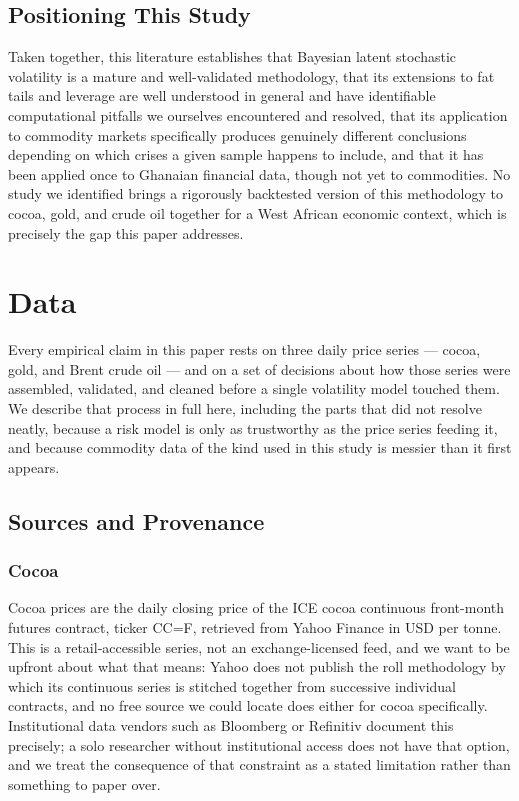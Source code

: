 \documentclass[preprint,12pt,authoryear]{elsarticle}
\begin{document}
\subsection{Positioning This Study}

Taken together, this literature establishes that Bayesian latent stochastic volatility is a mature and well-validated methodology, that its extensions to fat tails and leverage are well understood in general and have identifiable computational pitfalls we ourselves encountered and resolved, that its application to commodity markets specifically produces genuinely different conclusions depending on which crises a given sample happens to include, and that it has been applied once to Ghanaian financial data, though not yet to commodities. No study we identified brings a rigorously backtested version of this methodology to cocoa, gold, and crude oil together for a West African economic context, which is precisely the gap this paper addresses.

\section{Data}
\label{sec:data}

Every empirical claim in this paper rests on three daily price series
— cocoa, gold, and Brent crude oil — and on a set of decisions about
how those series were assembled, validated, and cleaned before a
single volatility model touched them. We describe that process in
full here, including the parts that did not resolve neatly, because a
risk model is only as trustworthy as the price series feeding it, and
because commodity data of the kind used in this study is messier than
it first appears.

\subsection{Sources and Provenance}
\label{sec:sources}

\subsubsection{Cocoa}

Cocoa prices are the daily closing price of the ICE cocoa continuous
front-month futures contract, ticker CC=F, retrieved from Yahoo
Finance in USD per tonne. This is a retail-accessible series, not an
exchange-licensed feed, and we want to be upfront about what that
means: Yahoo does not publish the roll methodology by which its
continuous series is stitched together from successive individual
contracts, and no free source we could locate does either for cocoa
specifically. Institutional data vendors such as Bloomberg or
Refinitiv document this precisely; a solo researcher without
institutional access does not have that option, and we treat the
consequence of that constraint as a stated limitation rather than
something to paper over.
\end{document}
